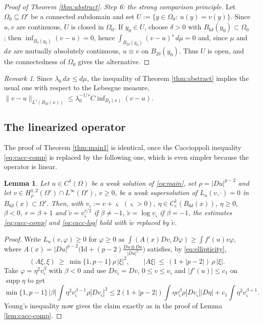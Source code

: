\documentclass[reqno]{amsart}
\theoremstyle{plain}
\newtheorem{lemma}[theorem]{Lemma}
\theoremstyle{definition}
\theoremstyle{remark}
\newtheorem{remark}[theorem]{Remark}
\newcommand{\supp}{\operatorname{supp}}
\begin{document}
\begin{proof}[Proof of Theorem \ref{thm:abstract}]
\emph{Step 6: the strong comparison principle.} Let $\Omega_0\subseteq\Omega'$ be a connected
subdomain and set $U:=\{y\in\Omega_0:\ u(y)=v(y)\}$. Since $u,v$ are continuous, $U$ is closed in
$\Omega_0$. If $y_0\in U$, choose $\delta>0$ with $\overline{B_{6\delta}(y_0)}\subset\Omega_0$; then
$\inf_{B_{\delta}(y_0)}(v-u)=0$, hence $\int_{B_{2\delta}(y_0)}(v-u)^s\,d\mu=0$ and, since $\mu$ and $dx$
are mutually absolutely continuous, $u\equiv v$ on $B_{2\delta}(y_0)$. Thus $U$ is open, and the
connectedness of $\Omega_0$ gives the alternative.
\end{proof}

\begin{remark}
Since $\lambda_0\,dx\le d\mu$, the inequality of Theorem \ref{thm:abstract} implies the usual one
with respect to the Lebesgue measure,
$\|v-u\|_{L^s(B_{2\delta}(x))}\le\lambda_0^{-1/s}C\inf_{B_{\delta}(x)}(v-u)$.
\end{remark}

\subsection{The linearized operator}\label{subsec:linearized}
The proof of Theorem \ref{thm:main1} is identical, once the Caccioppoli inequality
\eqref{eq:cacc-comp} is replaced by the following one, which is even simpler because the operator
is linear.

\begin{lemma}\label{lem:cacc-lin}
Let $u\in C^1(\Omega)$ be a weak solution of \eqref{eq:main}, set $\rho=|Du|^{p-2}$ and let
$v\in H^{1,2}_{\rho}(\Omega')\cap L^\infty(\Omega')$, $v\ge0$, be a weak supersolution of
$L_u(v,\cdot)=0$ in $B_{6\delta}(x)\subset\Omega'$. Then, with $v_\varsigma:=v+\varsigma$
$(\varsigma>0)$, $\eta\in C_c^1(B_{6\delta}(x))$, $\eta\ge0$, $\beta<0$, $r=\beta+1$ and
$\widetilde v=v_\varsigma^{r/2}$ if $\beta\ne-1$, $\widetilde v=\log v_\varsigma$ if $\beta=-1$,
the estimates \eqref{eq:cacc-comp} and \eqref{eq:cacc-log} hold with $\widetilde w$ replaced by
$\widetilde v$.
\end{lemma}

\begin{proof}
Write $L_u(v,\varphi)\ge0$ for $\varphi\ge0$ as
$\int(A(x)Dv,D\varphi)\ge\int f'(u)v\varphi$, where
$A(x)=|Du|^{p-2}\big(\mathrm{Id}+(p-2)\frac{Du\otimes Du}{|Du|^{2}}\big)$ satisfies, by
\eqref{eq:ellipticity},
\[
(A\xi,\xi)\ \ge\ \min\{1,p-1\}\,\rho\,|\xi|^2,\qquad |A\xi|\ \le\ (1+|p-2|)\,\rho\,|\xi| .
\]
Take $\varphi=\eta^2v_\varsigma^{\beta}$ with $\beta<0$ and use $Dv_\varsigma=Dv$,
$0\le v\le v_\varsigma$ and $|f'(u)|\le c_1$ on $\supp\eta$ to get
\[
\min\{1,p-1\}\,|\beta|\int\eta^2v_\varsigma^{\beta-1}\rho|Dv_\varsigma|^2
\le 2(1+|p-2|)\int\eta v_\varsigma^{\beta}\rho|Dv_\varsigma||D\eta|
+c_1\int\eta^2v_\varsigma^{\beta+1} .
\]
Young's inequality now gives the claim exactly as in the proof of Lemma \ref{lem:cacc-comp}.
\end{proof}
\end{document}
